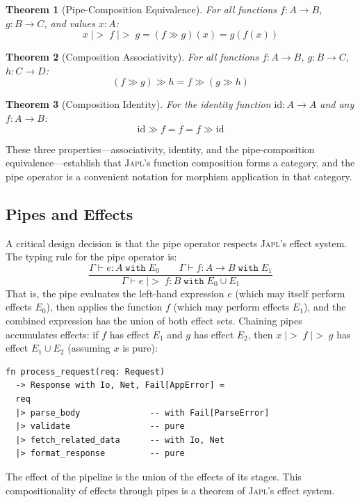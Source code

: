 \documentclass[11pt,a4paper]{article}
\newtheorem{theorem}{Theorem}[section]
\newcommand{\japl}{\textsc{Japl}}
\newcommand{\id}{\mathrm{id}}
\newcommand{\pipe}{\;|\!>\;}
\begin{document}
\begin{theorem}[Pipe-Composition Equivalence]
For all functions $f : A \to B$, $g : B \to C$, and values $x : A$:
\[
x \pipe f \pipe g = (f \gg g)(x) = g(f(x))
\]
\end{theorem}

\begin{theorem}[Composition Associativity]
For all functions $f : A \to B$, $g : B \to C$, $h : C \to D$:
\[
(f \gg g) \gg h = f \gg (g \gg h)
\]
\end{theorem}

\begin{theorem}[Composition Identity]
For the identity function $\id : A \to A$ and any $f : A \to B$:
\[
\id \gg f = f = f \gg \id
\]
\end{theorem}

These three properties---associativity, identity, and the pipe-composition equivalence---establish that \japl{}'s function composition forms a category, and the pipe operator is a convenient notation for morphism application in that category.

\subsection{Pipes and Effects}

A critical design decision is that the pipe operator respects \japl{}'s effect system. The typing rule for the pipe operator is:
\[
\frac{\Gamma \vdash e : A \;\texttt{with}\; E_0 \qquad \Gamma \vdash f : A \to B \;\texttt{with}\; E_1}{\Gamma \vdash e \pipe f : B \;\texttt{with}\; E_0 \cup E_1}
\]
That is, the pipe evaluates the left-hand expression $e$ (which may itself perform effects $E_0$), then applies the function $f$ (which may perform effects $E_1$), and the combined expression has the union of both effect sets. Chaining pipes accumulates effects: if $f$ has effect $E_1$ and $g$ has effect $E_2$, then $x \pipe f \pipe g$ has effect $E_1 \cup E_2$ (assuming $x$ is pure):

\begin{lstlisting}
fn process_request(req: Request)
  -> Response with Io, Net, Fail[AppError] =
  req
  |> parse_body              -- with Fail[ParseError]
  |> validate                -- pure
  |> fetch_related_data      -- with Io, Net
  |> format_response         -- pure
\end{lstlisting}

The effect of the pipeline is the union of the effects of its stages. This compositionality of effects through pipes is a theorem of \japl{}'s effect system.
\end{document}
